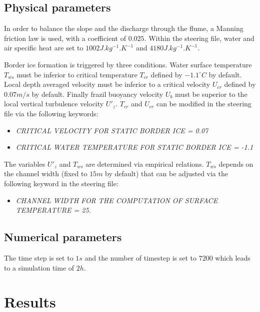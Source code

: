 \subsection{Physical parameters}

In order to balance the slope and the discharge through the flume, a Manning friction law is used, with a coefficient of $0.025$. Within the \waqtel steering file, water and air specific heat are set to $1002J.kg^{-1}.K^{-1}$ and $4180 J.kg^{-1}.K^{-1}$.

Border ice formation is triggered by three conditions. Water surface temperature $T_{ws}$ must be inferior to critical temperature $T_{cr}$ defined by $-1.1^{\circ} C$ by default. Local depth averaged velocity must be inferior to a critical velocity $U_{cr}$ defined by $0.07 m/s$ by default. Finally frazil buoyancy velocity $U_b$ must be superior to the local vertical turbulence velocity $U'_z$. $T_{cr}$ and $U_{cr}$ can be modified in the \khione steering file via the following keywords:
\begin{itemize}
	\item\textit{CRITICAL VELOCITY FOR STATIC BORDER ICE = 0.07}
	\item\textit{CRITICAL WATER TEMPERATURE FOR STATIC BORDER ICE = -1.1}
\end{itemize}
The variables $U'_z$ and $T_{ws}$ are determined via empirical relations. $T_{ws}$ depends on the channel width (fixed to $15m$ by default) that can be adjusted via the following keyword in the \khione steering file:
\begin{itemize}
	\item\textit{CHANNEL WIDTH FOR THE COMPUTATION OF SURFACE TEMPERATURE = 25.}
\end{itemize}

\subsection{Numerical parameters}
The time step is set to $1s$ and the number of timestep is set to $7200$ which leads to a simulation time of $2h$.

\section{Results}


